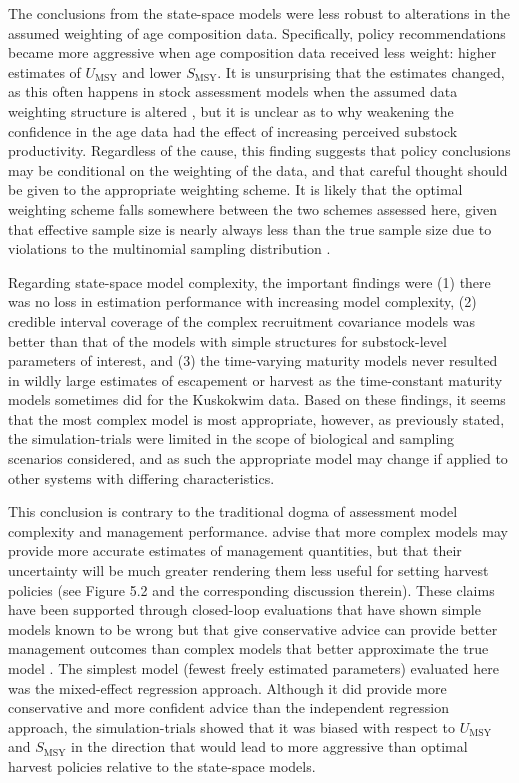 \documentclass[12pt,]{book}
\theoremstyle{definition}
\theoremstyle{definition}
\theoremstyle{definition}
\theoremstyle{remark}
\begin{document}
The conclusions from the state-space models were less robust to
alterations in the assumed weighting of age composition data.
Specifically, policy recommendations became more aggressive when age
composition data received less weight: higher estimates of
\(U_{\text{MSY}}\) and lower \(S_{\text{MSY}}\). It is unsurprising that
the estimates changed, as this often happens in stock assessment models
when the assumed data weighting structure is altered
\citep{hulson-etal-2011}, but it is unclear as to why weakening the
confidence in the age data had the effect of increasing perceived
substock productivity. Regardless of the cause, this finding suggests
that policy conclusions may be conditional on the weighting of the data,
and that careful thought should be given to the appropriate weighting
scheme. It is likely that the optimal weighting scheme falls somewhere
between the two schemes assessed here, given that effective sample size
is nearly always less than the true sample size due to violations to the
multinomial sampling distribution \citep[\emph{e}.\emph{g}., sampled
individuals show similarities that result in clustering,
non-independence, and overdispersion;][]{maunder-2011}.

Regarding state-space model complexity, the important findings were (1)
there was no loss in estimation performance with increasing model
complexity, (2) credible interval coverage of the complex recruitment
covariance models was better than that of the models with simple
structures for substock-level parameters of interest, and (3) the
time-varying maturity models never resulted in wildly large estimates of
escapement or harvest as the time-constant maturity models sometimes did
for the Kuskokwim data. Based on these findings, it seems that the most
complex model is most appropriate, however, as previously stated, the
simulation-trials were limited in the scope of biological and sampling
scenarios considered, and as such the appropriate model may change if
applied to other systems with differing characteristics.

This conclusion is contrary to the traditional dogma of assessment model
complexity and management performance. \citet{walters-martell-2004}
advise that more complex models may provide more accurate estimates of
management quantities, but that their uncertainty will be much greater
rendering them less useful for setting harvest policies (see Figure 5.2
and the corresponding discussion therein). These claims have been
supported through closed-loop evaluations that have shown simple models
known to be wrong but that give conservative advice can provide better
management outcomes than complex models that better approximate the true
model \citep[\emph{e}.\emph{g}.,][]{hilborn-1979, ludwig-walters-1985}.
The simplest model (fewest freely estimated parameters) evaluated here
was the mixed-effect regression approach. Although it did provide more
conservative and more confident advice than the independent regression
approach, the simulation-trials showed that it was biased with respect
to \(U_{\text{MSY}}\) and \(S_{\text{MSY}}\) in the direction that would
lead to more aggressive than optimal harvest policies relative to the
state-space models.
\end{document}
